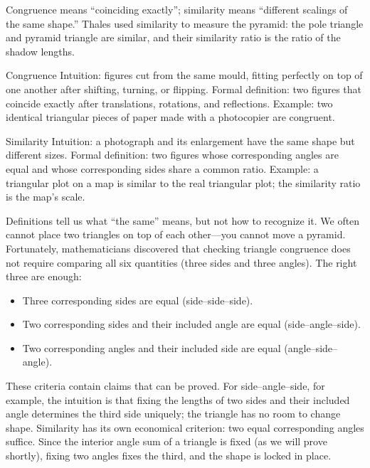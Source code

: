 Congruence means ``coinciding exactly''; similarity means ``different scalings of the same shape.'' Thales used similarity to measure the pyramid: the pole triangle and pyramid triangle are similar, and their similarity ratio is the ratio of the shadow lengths.

\begin{shuyu}{Congruence}
Intuition: figures cut from the same mould, fitting perfectly on top of one another after shifting, turning, or flipping.
Formal definition: two figures that coincide exactly after translations, rotations, and reflections.
Example: two identical triangular pieces of paper made with a photocopier are congruent.
\end{shuyu}

\begin{shuyu}{Similarity}
Intuition: a photograph and its enlargement have the same shape but different sizes.
Formal definition: two figures whose corresponding angles are equal and whose corresponding sides share a common ratio.
Example: a triangular plot on a map is similar to the real triangular plot; the similarity ratio is the map's scale.
\end{shuyu}

Definitions tell us what ``the same'' means, but not how to recognize it. We often cannot place two triangles on top of each other---you cannot move a pyramid. Fortunately, mathematicians discovered that checking triangle congruence does not require comparing all six quantities (three sides and three angles). The right three are enough:

\begin{itemize}
\item Three corresponding sides are equal (side--side--side).
\item Two corresponding sides and their included angle are equal (side--angle--side).
\item Two corresponding angles and their included side are equal (angle--side--angle).
\end{itemize}

These criteria contain claims that can be proved. For side--angle--side, for example, the intuition is that fixing the lengths of two sides and their included angle determines the third side uniquely; the triangle has no room to change shape. Similarity has its own economical criterion: two equal corresponding angles suffice. Since the interior angle sum of a triangle is fixed (as we will prove shortly), fixing two angles fixes the third, and the shape is locked in place.


